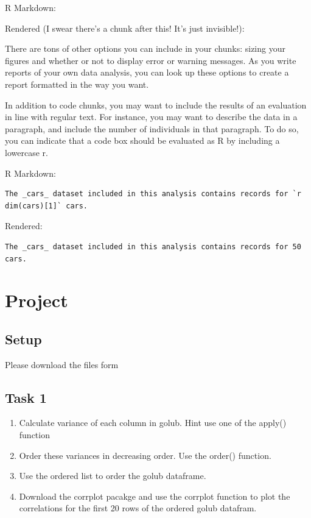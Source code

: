 \documentclass[
]{book}
\providecommand{\tightlist}{%
  \setlength{\itemsep}{0pt}\setlength{\parskip}{0pt}}
\begin{document}
R Markdown:

Rendered (I swear there's a chunk after this! It's just invisible!):

There are tons of other options you can include in your chunks: sizing your figures and whether or not to display error or warning messages. As you write reports of your own data analysis, you can look up these options to create a report formatted in the way you want.

In addition to code chunks, you may want to include the results of an evaluation in line with regular text. For instance, you may want to describe the data in a paragraph, and include the number of individuals in that paragraph. To do so, you can indicate that a code box should be evaluated as R by including a lowercase r.

R Markdown:

\begin{verbatim}
The _cars_ dataset included in this analysis contains records for `r dim(cars)[1]` cars. 
\end{verbatim}

Rendered:

\begin{verbatim}
The _cars_ dataset included in this analysis contains records for 50 cars.
\end{verbatim}

\hypertarget{project}{%
\chapter{Project}\label{project}}

\hypertarget{setup-1}{%
\section{Setup}\label{setup-1}}

Please download the files form

\hypertarget{task-1}{%
\section{Task 1}\label{task-1}}

\begin{enumerate}
\def\labelenumi{\arabic{enumi}.}
\tightlist
\item
  Calculate variance of each column in golub. Hint use one of the apply() function
\item
  Order these variances in decreasing order. Use the order() function.
\item
  Use the ordered list to order the golub dataframe.
\item
  Download the corrplot pacakge and use the corrplot function to plot the correlations for the first 20 rows of the ordered golub datafram.
\end{enumerate}
\end{document}
